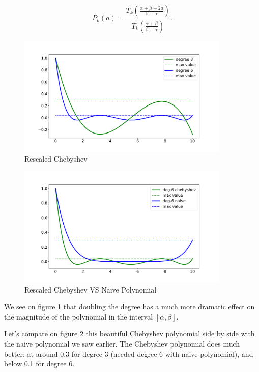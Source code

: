 \begin{equation*}
P_k(a) = \frac{T_k\left(\frac{\alpha + \beta - 2a}{\beta - \alpha}\right)}{T_k\left(\frac{\alpha + \beta}{\beta - \alpha}\right)}.
\end{equation*}
\begin{figure}[ht]
\includegraphics[width=0.9\textwidth]{figures/lecture6-rescaled_cheb.pdf}
\centering
\caption{Rescaled Chebyshev}
\label{rescales_chebyshev}
\end{figure}

\begin{figure}[ht]
\includegraphics[width=0.9\textwidth]{figures/lecture6-rescaled_cheb_vs_naive.pdf}
\centering
\caption{Rescaled Chebyshev VS Naive Polynomial}
\label{rescaled_chebyshev_vs_naive_p}
\end{figure}

We see on figure \ref{rescales_chebyshev} that doubling the degree has a much more dramatic effect on the magnitude of the polynomial in the interval $[\alpha, \beta].$

Let's compare on figure \ref{rescaled_chebyshev_vs_naive_p} this beautiful Chebyshev polynomial side by side with the naive polynomial we saw earlier. The Chebyshev polynomial does much better: at around 0.3 for degree 3 (needed degree 6 with naive polynomial), and below 0.1 for degree 6.


